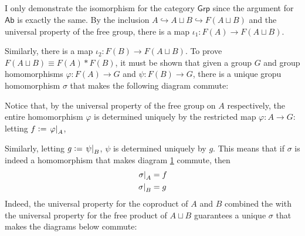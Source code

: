 \documentclass[12pt]{article}
\begin{document}
\subsection{} \label{subsec:5_8}
I only demonstrate the isomorphism for the category $\mathsf{Grp}$ since the argument for $\mathsf{Ab}$ is exactly the same. 
By the inclusion $A \hookrightarrow A \sqcup B \hookrightarrow F(A \sqcup B)$ and the universal property of the free group, there is a map $\iota_1: F(A) \rightarrow F(A \sqcup B)$. 
\begin{center}
\end{center}
Similarly, there is a map $\iota_2: F(B) \rightarrow F(A \sqcup B)$. 
To prove $F(A \sqcup B) \equiv F(A) * F(B)$, it must be shown that given a group $G$ and group homomorphisms $\varphi: F(A) \rightarrow G$ and $\psi: F(B) \rightarrow G$, there is a unique gropu homomorphism $\sigma$ that makes the following diagram commute: 
\begin{figure}[h]
  \centering
  \captionsetup{labelsep=period}
  \renewcommand{\figurename}{Diagram}
  \caption{}
  \label{fig:5_8_up}
\end{figure}
Notice that, by the universal property of the free group on $A$ respectively, the entire homomorphism $\varphi$ is determined uniquely by the restricted map $\varphi: A \rightarrow G$: 
letting $f \vcentcolon= \left. \varphi \right|_A$, 
\begin{center}
\end{center}
Similarly, letting $g \vcentcolon= \left.\psi\right|_{B}$, $\psi$ is determined uniquely by $g$. 
  This means that if $\sigma$ is indeed a homomorphism that makes diagram \ref{fig:5_8_up} commute, then 
\begin{align*}
  \left.\sigma\right|_{A} & = f \\ 
  \left.\sigma\right|_{B} & = g
\end{align*}
Indeed, the universal property for the coproduct of $A$ and $B$ combined the with the universal property for the free product of $A \sqcup B$ guarantees a unique $\sigma$ that makes the diagrams below commute: 
\end{document}
